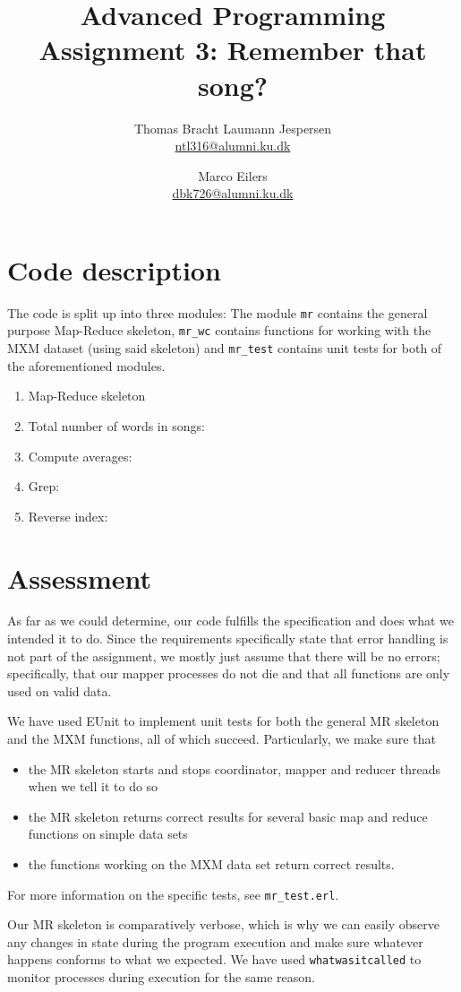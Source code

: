 \documentclass[a4paper]{article}
\title{Advanced Programming\\ Assignment 3: Remember that song?}
\author{Thomas Bracht Laumann Jespersen\\ \url{ntl316@alumni.ku.dk} \and Marco Eilers\\ \url{dbk726@alumni.ku.dk} }
\begin{document}
\maketitle
\section*{Code description}
The code is split up into three modules: The module \texttt{mr}
 contains the general purpose Map-Reduce skeleton, \texttt{mr\_wc} contains functions for working with the MXM dataset
 (using said skeleton) and \texttt{mr\_test} contains
  unit tests for both of the aforementioned modules.

\begin{enumerate}
\item Map-Reduce skeleton
\item Total number of words in songs:
\item Compute averages:
\item Grep:
\item Reverse index:
\end{enumerate}

\section*{Assessment}
As far as we could determine, our code fulfills the specification and does what we intended it to do. Since the requirements specifically state that error handling is not part of the assignment, we mostly just assume that there will be no errors; specifically, that our mapper processes do not die and that all functions are only used on valid data.

We have used EUnit to implement unit tests for both the general MR skeleton and the MXM functions, all of which succeed. Particularly, we make sure that
\begin{itemize}
  \item the MR skeleton starts and stops coordinator, mapper and reducer threads when we tell it to do so
  \item the MR skeleton returns correct results for several basic map and reduce functions on simple data sets
  \item the functions working on the MXM data set return correct results.
\end{itemize}
For more information on the specific tests, see \texttt{mr\_test.erl}.

Our MR skeleton is comparatively verbose, which is why we can easily observe any changes in state during the program execution and make sure whatever happens conforms to what we expected. We have used \texttt{whatwasitcalled} to monitor processes during execution for the same reason.
\end{document}
